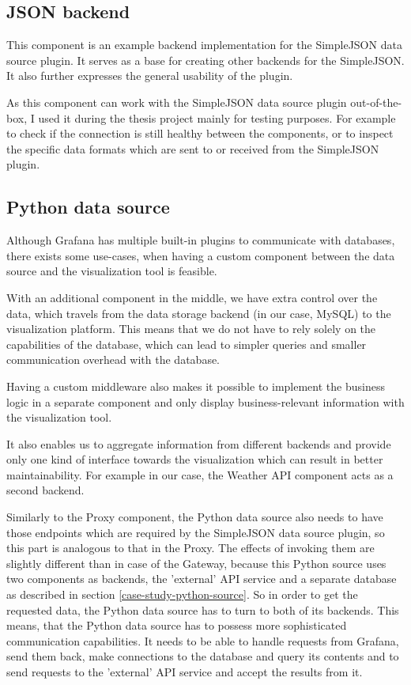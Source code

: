 \subsection{JSON backend}
This component is an example backend implementation for the SimpleJSON data source plugin. It serves as a base for creating other backends for the SimpleJSON. It also further expresses the general usability of the plugin. \cite{fake-simple-json-datasource}

As this component can work with the SimpleJSON data source plugin out-of-the-box, I used it during the thesis project mainly for testing purposes. For example to check if the connection is still healthy between the components, or to inspect the specific data formats which are sent to or received from the SimpleJSON plugin.

\subsection{Python data source}

Although Grafana has multiple built-in plugins to communicate with databases, there exists some use-cases, when having a custom component between the data source and the visualization tool is feasible.

With an additional component in the middle, we have extra control over the data, which travels from the data storage backend (in our case, MySQL) to the visualization platform. This means that we do not have to rely solely on the capabilities of the database, which can lead to simpler queries and smaller communication overhead with the database.

Having a custom middleware also makes it possible to implement the business logic in a separate component and only display business-relevant information with the visualization tool.

It also enables us to aggregate information from different backends and provide only one kind of interface towards the visualization which can result in better maintainability. For example in our case, the Weather API component acts as a second backend.

Similarly to the Proxy component, the Python data source also needs to have those endpoints which are required by the SimpleJSON data source plugin, so this part is analogous to that in the Proxy. The effects of invoking them are slightly different than in case of the Gateway, because this Python source uses two components as backends, the 'external' API service and a separate database as described in section \ref{case-study-python-source}. So in order to get the requested data, the Python data source has to turn to both of its backends. This means, that the Python data source has to possess more sophisticated communication capabilities. It needs to be able to handle requests from Grafana, send them back, make connections to the database and query its contents and to send requests to the 'external' API service and accept the results from it.

